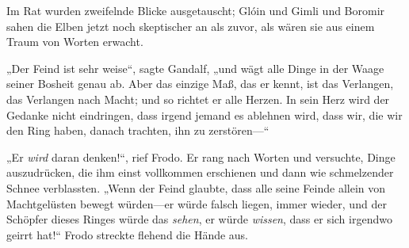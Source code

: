 Im Rat wurden zweifelnde Blicke ausgetauscht; Glóin und Gimli und Boromir sahen die Elben jetzt noch skeptischer an als zuvor, als wären sie aus einem Traum von Worten erwacht.

„Der Feind ist sehr weise“, sagte Gandalf, „und wägt alle Dinge in der Waage seiner Bosheit genau ab. Aber das einzige Maß, das er kennt, ist das Verlangen, das Verlangen nach Macht; und so richtet er alle Herzen. In sein Herz wird der Gedanke nicht eindringen, dass irgend jemand es ablehnen wird, dass wir, die wir den Ring haben, danach trachten, ihn zu zerstören—“

„Er \emph{wird} daran denken!“, rief Frodo. Er rang nach Worten und versuchte, Dinge auszudrücken, die ihm einst vollkommen erschienen und dann wie schmelzender Schnee verblassten. „Wenn der Feind glaubte, dass alle seine Feinde allein von Machtgelüsten bewegt würden—er würde falsch liegen, immer wieder, und der Schöpfer dieses Ringes würde das \emph{sehen}, er würde \emph{wissen}, dass er sich irgendwo geirrt hat!“ Frodo streckte flehend die Hände aus.

